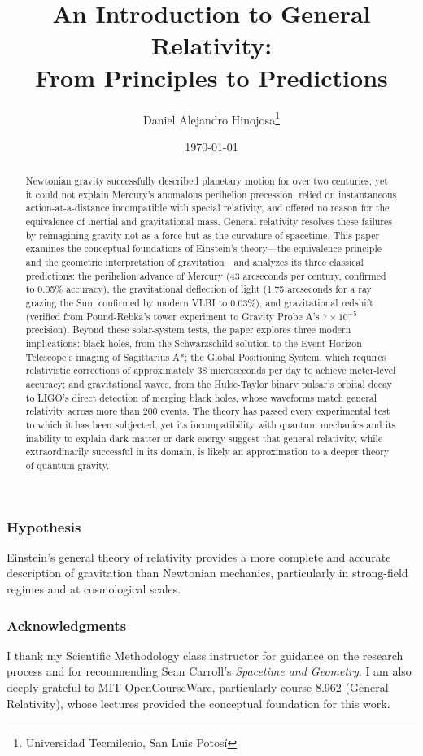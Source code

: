 \documentclass[12pt, a4paper]{article}
\title{An Introduction to General Relativity: \\ From Principles to Predictions}
\author{Daniel Alejandro Hinojosa\thanks{Universidad Tecmilenio, San Luis Potosí}}
\date{\small{\today}}
\begin{document}
	\maketitle	
	\begin{abstract}
		Newtonian gravity successfully described planetary motion for over two centuries, yet it could not explain Mercury's anomalous perihelion precession, relied on instantaneous action-at-a-distance incompatible with special relativity, and offered no reason for the equivalence of inertial and gravitational mass. General relativity resolves these failures by reimagining gravity not as a force but as the curvature of spacetime. This paper examines the conceptual foundations of Einstein's theory—the equivalence principle and the geometric interpretation of gravitation—and analyzes its three classical predictions: the perihelion advance of Mercury (43 arcseconds per century, confirmed to 0.05\% accuracy), the gravitational deflection of light (1.75 arcseconds for a ray grazing the Sun, confirmed by modern VLBI to 0.03\%), and gravitational redshift (verified from Pound-Rebka's tower experiment to Gravity Probe A's $7\times10^{−5}$ precision). Beyond these solar-system tests, the paper explores three modern implications: black holes, from the Schwarzschild solution to the Event Horizon Telescope's imaging of Sagittarius A*; the Global Positioning System, which requires relativistic corrections of approximately 38 microseconds per day to achieve meter-level accuracy; and gravitational waves, from the Hulse-Taylor binary pulsar's orbital decay to LIGO's direct detection of merging black holes, whose waveforms match general relativity across more than 200 events. The theory has passed every experimental test to which it has been subjected, yet its incompatibility with quantum mechanics and its inability to explain dark matter or dark energy suggest that general relativity, while extraordinarily successful in its domain, is likely an approximation to a deeper theory of quantum gravity.
	\end{abstract}
	
	\subsubsection*{Hypothesis} 
	Einstein's general theory of relativity provides a more complete and accurate description of gravitation than Newtonian mechanics, particularly in strong-field regimes and at cosmological scales.
	
	\subsubsection*{Acknowledgments}
	I thank my Scientific Methodology class instructor for guidance on 	the research process and for recommending Sean Carroll's \textit{Spacetime and Geometry}. I am also deeply grateful to MIT OpenCourseWare, particularly course 8.962 (General Relativity), whose lectures provided the conceptual foundation for this work.
	
\end{document}
